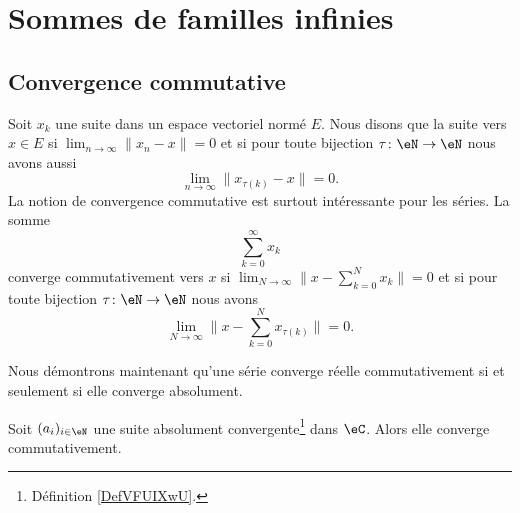 \section{Sommes de familles infinies}
\label{SECooHHDXooUgLhHR}

\subsection{Convergence commutative}

\begin{definition}
	Soit \( x_k\) une suite dans un espace vectoriel normé \( E\). Nous disons que la suite  vers \( x\in E\) si \( \lim_{n\to \infty}\| x_n-x \| =0\) et si pour toute bijection \( \tau\colon \eN\to \eN\) nous avons aussi
	\begin{equation}
		\lim_{n\to \infty} \| x_{\tau(k)}-x \|=0.
	\end{equation}
	La notion de convergence commutative est surtout intéressante pour les séries. La somme
	\begin{equation}
		\sum_{k=0}^{\infty}x_k
	\end{equation}
	converge commutativement vers \( x\) si \( \lim_{N\to \infty} \| x-\sum_{k=0}^Nx_k \|=0\) et si pour toute bijection \( \tau\colon \eN\to \eN\) nous avons
	\begin{equation}
		\lim_{N\to \infty} \| x-\sum_{k=0}^Nx_{\tau(k)} \|=0.
	\end{equation}
\end{definition}

Nous démontrons maintenant qu'une série converge réelle commutativement si et seulement si elle converge absolument.

\begin{proposition} \label{PopriXWvIY}
	Soit \( (a_i)_{i\in \eN}\) une suite absolument convergente\footnote{Définition \ref{DefVFUIXwU}.} dans \( \eC\). Alors elle converge commutativement.
\end{proposition}

